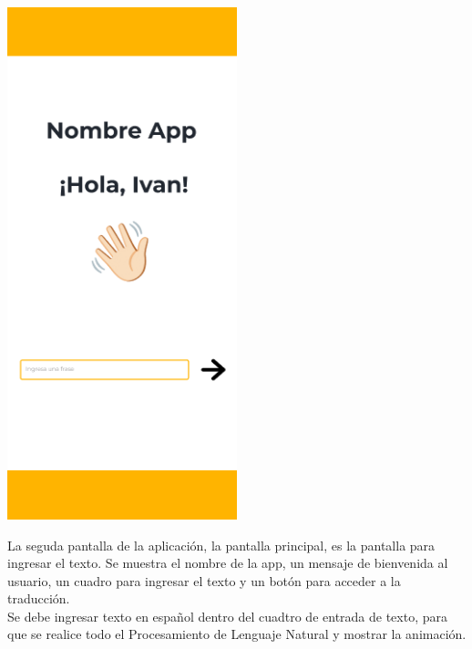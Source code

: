 \begin{center}
    \includegraphics[width=0.5\textwidth]{Images/Cap 3/Pantalla2.png}
\end{center}

La seguda pantalla de la aplicación, la pantalla principal, es la pantalla para ingresar el texto. Se muestra el nombre de la app, un mensaje de bienvenida al usuario, un cuadro para ingresar el texto y un botón para acceder a la traducción.\\

Se debe ingresar texto en español dentro del cuadtro de entrada de texto, para que se realice todo el Procesamiento de Lenguaje Natural y mostrar la animación.

